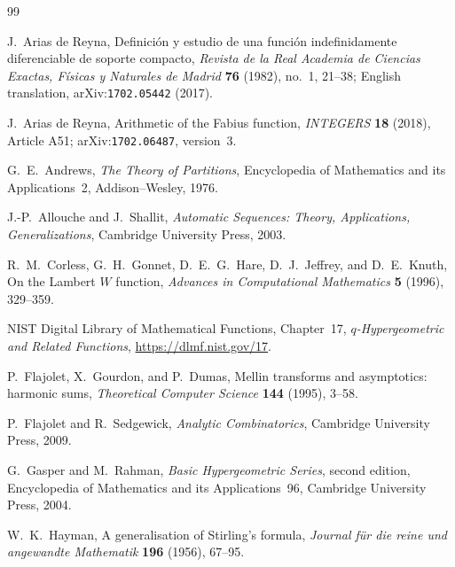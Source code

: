 \documentclass[11pt,oneside]{article}
\theoremstyle{definition}
\theoremstyle{remark}
\begin{document}
\renewcommand{\refname}{Dossier references}
\begin{thebibliography}{99}

J.~Arias de Reyna,
\newblock Definici\'on y estudio de una funci\'on indefinidamente diferenciable de soporte
  compacto,
\newblock \emph{Revista de la Real Academia de Ciencias Exactas, F\'isicas y Naturales de
  Madrid} \textbf{76} (1982), no.~1, 21--38;
  English translation, arXiv:\nolinkurl{1702.05442} (2017).

J.~Arias de Reyna,
\newblock Arithmetic of the Fabius function,
\newblock \emph{INTEGERS} \textbf{18} (2018), Article A51;
  arXiv:\nolinkurl{1702.06487}, version~3.

G.~E.~Andrews,
\newblock \emph{The Theory of Partitions},
\newblock Encyclopedia of Mathematics and its Applications~2,
  Addison--Wesley, 1976.

J.-P.~Allouche and J.~Shallit,
\newblock \emph{Automatic Sequences: Theory, Applications, Generalizations},
\newblock Cambridge University Press, 2003.

R.~M.~Corless, G.~H.~Gonnet, D.~E.~G.~Hare, D.~J.~Jeffrey, and D.~E.~Knuth,
\newblock On the Lambert $W$ function,
\newblock \emph{Advances in Computational Mathematics} \textbf{5} (1996), 329--359.

NIST Digital Library of Mathematical Functions, Chapter~17,
\newblock \emph{$q$-Hypergeometric and Related Functions},
\newblock \url{https://dlmf.nist.gov/17}.

P.~Flajolet, X.~Gourdon, and P.~Dumas,
\newblock Mellin transforms and asymptotics: harmonic sums,
\newblock \emph{Theoretical Computer Science} \textbf{144} (1995), 3--58.

P.~Flajolet and R.~Sedgewick,
\newblock \emph{Analytic Combinatorics},
\newblock Cambridge University Press, 2009.

G.~Gasper and M.~Rahman,
\newblock \emph{Basic Hypergeometric Series}, second edition,
\newblock Encyclopedia of Mathematics and its Applications~96,
  Cambridge University Press, 2004.

W.~K.~Hayman,
\newblock A generalisation of Stirling's formula,
\newblock \emph{Journal f\"ur die reine und angewandte Mathematik}
  \textbf{196} (1956), 67--95.


\end{thebibliography}
\end{document}
